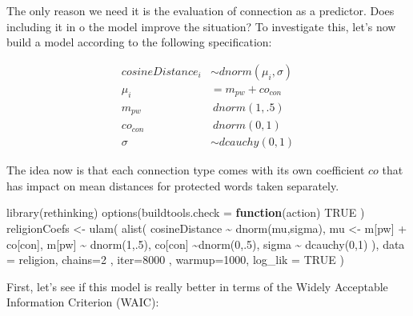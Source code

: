 \documentclass[
  12pt,
]{book}
\newenvironment{Shaded}{\begin{snugshade}}{\end{snugshade}}
\newcommand{\AttributeTok}[1]{\textcolor[rgb]{0.77,0.63,0.00}{#1}}
\newcommand{\ConstantTok}[1]{\textcolor[rgb]{0.00,0.00,0.00}{#1}}
\newcommand{\ControlFlowTok}[1]{\textcolor[rgb]{0.13,0.29,0.53}{\textbf{#1}}}
\newcommand{\DecValTok}[1]{\textcolor[rgb]{0.00,0.00,0.81}{#1}}
\newcommand{\FunctionTok}[1]{\textcolor[rgb]{0.00,0.00,0.00}{#1}}
\newcommand{\NormalTok}[1]{#1}
\newcommand{\OtherTok}[1]{\textcolor[rgb]{0.56,0.35,0.01}{#1}}
\newcommand{\SpecialCharTok}[1]{\textcolor[rgb]{0.00,0.00,0.00}{#1}}
\begin{document}
The only reason we need it is the evaluation of connection as a predictor. Does including it in o the model improve the situation? To investigate this, let's now build a model according to the following specification:

\begin{align}
cosineDistance_i  & \sim dnorm(\mu_i, \sigma) \\
\mu_i & = m_{pw} + co_{con}\\
m_{pw} & ~ dnorm(1,.5) \\
co_{con} & ~ dnorm(0,1) \\
\sigma &\sim  dcauchy(0,1)
\end{align}

\noindent The idea now is that each connection type comes with its own coefficient \(co\) that has impact on mean distances for protected words taken separately.

\vspace{1mm}
\footnotesize

\begin{Shaded}
\begin{Highlighting}[]
\FunctionTok{library}\NormalTok{(rethinking)}
\FunctionTok{options}\NormalTok{(}\AttributeTok{buildtools.check =} \ControlFlowTok{function}\NormalTok{(action) }\ConstantTok{TRUE}\NormalTok{ )}
\NormalTok{religionCoefs }\OtherTok{\textless{}{-}} \FunctionTok{ulam}\NormalTok{(}
  \FunctionTok{alist}\NormalTok{(}
\NormalTok{    cosineDistance }\SpecialCharTok{\textasciitilde{}} \FunctionTok{dnorm}\NormalTok{(mu,sigma),}
\NormalTok{    mu }\OtherTok{\textless{}{-}}\NormalTok{ m[pw] }\SpecialCharTok{+}\NormalTok{ co[con],}
\NormalTok{    m[pw] }\SpecialCharTok{\textasciitilde{}} \FunctionTok{dnorm}\NormalTok{(}\DecValTok{1}\NormalTok{,.}\DecValTok{5}\NormalTok{),}
\NormalTok{    co[con] }\SpecialCharTok{\textasciitilde{}}\FunctionTok{dnorm}\NormalTok{(}\DecValTok{0}\NormalTok{,.}\DecValTok{5}\NormalTok{),}
\NormalTok{    sigma }\SpecialCharTok{\textasciitilde{}} \FunctionTok{dcauchy}\NormalTok{(}\DecValTok{0}\NormalTok{,}\DecValTok{1}\NormalTok{)}
\NormalTok{  ),}
  \AttributeTok{data =}\NormalTok{ religion,}
  \AttributeTok{chains=}\DecValTok{2}\NormalTok{ , }\AttributeTok{iter=}\DecValTok{8000}\NormalTok{ , }\AttributeTok{warmup=}\DecValTok{1000}\NormalTok{, }
  \AttributeTok{log\_lik =} \ConstantTok{TRUE}
\NormalTok{)}
\end{Highlighting}
\end{Shaded}

\normalsize

\noindent First, let's see if this model is really better in terms of the Widely Acceptable Information Criterion (WAIC):
\end{document}
